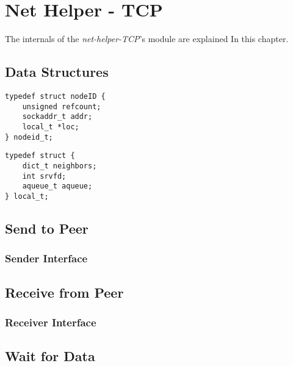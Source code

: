 \section{Net Helper - TCP}
The internals of the \textit{net-helper-TCP}'s module are explained In this chapter. 



\subsection{Data Structures}

\begin{lstlisting}
typedef struct nodeID {
    unsigned refcount;
    sockaddr_t addr;
    local_t *loc;
} nodeid_t;
\end{lstlisting}


\begin{lstlisting}
typedef struct {
    dict_t neighbors;
    int srvfd;
    aqueue_t aqueue;
} local_t;
\end{lstlisting}


\subsection{Send to Peer}

\subsubsection{Sender Interface}

\subsection{Receive from Peer}

\subsubsection{Receiver Interface}

\subsection{Wait for Data}

